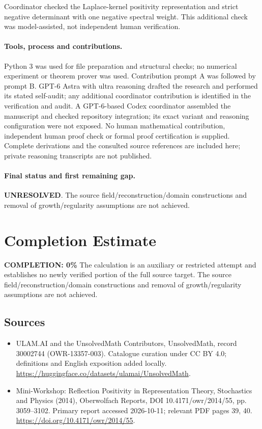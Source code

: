 \documentclass[11pt]{article}
\begin{document}
Coordinator checked the Laplace-kernel positivity representation and strict negative determinant with one negative spectral weight. This additional check was model-assisted, not independent human verification.

\paragraph{Tools, process and contributions.}
Python 3 was used for file preparation and structural checks; no numerical experiment or theorem prover was used. Contribution prompt A was followed by prompt B. GPT-6 Astra with ultra reasoning drafted the research and performed its stated self-audit; any additional coordinator contribution is identified in the verification and audit. A GPT-6-based Codex coordinator assembled the manuscript and checked repository integration; its exact variant and reasoning configuration were not exposed. No human mathematical contribution, independent human proof check or formal proof certification is supplied. Complete derivations and the consulted source references are included here; private reasoning transcripts are not published.

\paragraph{Final status and first remaining gap.}
\textbf{UNRESOLVED}. The source field/reconstruction/domain constructions and removal of growth/regularity assumptions are not achieved.

\section{Completion Estimate}
\noindent\textbf{COMPLETION: 0\%}
The calculation is an auxiliary or restricted attempt and establishes no newly verified portion of the full source target. The source field/reconstruction/domain constructions and removal of growth/regularity assumptions are not achieved.

\subsection{Sources}
\begin{itemize}
\item[\hypertarget{source:30002744:1}{S1}] ULAM.AI and the UnsolvedMath Contributors, UnsolvedMath, record 30002744 (OWR-13357-003). Catalogue curation under CC BY 4.0; definitions and English exposition added locally.
\url{https://huggingface.co/datasets/ulamai/UnsolvedMath}.
\item[\hypertarget{source:30002744:2}{S2}] Mini-Workshop: Reflection Positivity in Representation Theory, Stochastics and Physics (2014), Oberwolfach Reports, DOI 10.4171/owr/2014/55, pp. 3059--3102. Primary report accessed 2026-10-11; relevant PDF pages 39, 40.
\url{https://doi.org/10.4171/owr/2014/55}.
\end{itemize}
\label{end:30002744}
\end{document}
